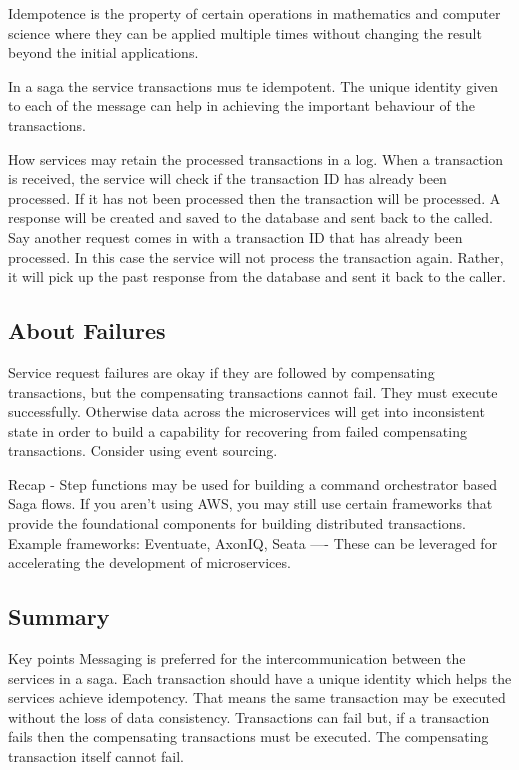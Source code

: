 \documentclass[a4paper, 11pt]{book}
\begin{document}
    Idempotence is the property of certain operations in mathematics and computer science where they can be applied multiple times without changing the result beyond the initial applications.

    In a saga the service transactions mus te idempotent.
    The unique identity given to each of the message can help in achieving the important behaviour of the transactions.

    How services may retain the processed transactions in a log.
    When a transaction is received, the service will check if the transaction ID has already been processed.
    If it has not been processed then the transaction will be processed.
    A response will be created and saved to the database and sent back to the called.
    Say another request comes in with a transaction ID that has already been processed.
    In this case the service will not process the transaction again.
    Rather, it will pick up the past response from the database and sent it back to the caller.

    \subsection{About Failures}
    Service request failures are okay if they are followed by compensating transactions, but the compensating transactions cannot fail.
    They must execute successfully.
    Otherwise data across the microservices will get into inconsistent state in order to build a capability for recovering from failed compensating transactions.
    Consider using event sourcing.

    Recap - Step functions may be used for building a command orchestrator based Saga flows.
    If you aren't using AWS, you may still use certain frameworks that provide the foundational components for building distributed transactions.
    Example frameworks: Eventuate, AxonIQ, Seata ---- These can be leveraged for accelerating the development of microservices.

    \subsection{Summary}
    Key points
    Messaging is preferred for the intercommunication between the services in a saga.
    Each transaction should have a unique identity which helps the services achieve idempotency.
    That means the same transaction may be executed without the loss of data consistency.
    Transactions can fail but, if a transaction fails then the compensating transactions must be executed.
    The compensating transaction itself cannot fail.
\end{document}

